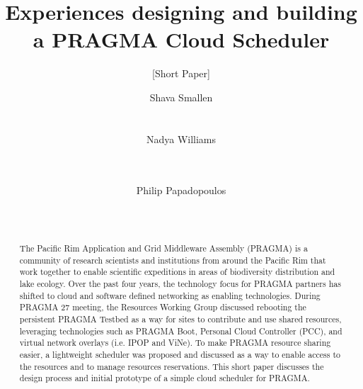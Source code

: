 \documentclass{acm_proc_article-sp}
\begin{document}
\title{Experiences designing and building a PRAGMA Cloud Scheduler}
\subtitle{[Short Paper]}


\author{
\alignauthor
Shava Smallen\\
      \\
      \\
\alignauthor
Nadya Williams\\
      \\
      \\
\and %
\alignauthor Philip Papadopoulos \\
      \\
      \\
}

\maketitle
\begin{abstract}
The Pacific Rim Application and Grid Middleware Assembly (PRAGMA) is a community of research scientists and institutions from around the Pacific Rim that work together to enable scientific expeditions in areas of biodiversity distribution and lake ecology.  Over the past four years, the technology focus for PRAGMA partners has shifted to cloud and software defined networking as enabling technologies.  During PRAGMA 27 meeting, the Resources Working Group discussed rebooting the persistent PRAGMA Testbed as a way for sites to contribute and use shared resources, leveraging technologies such as PRAGMA Boot, Personal Cloud Controller (PCC), and virtual network overlays (i.e. IPOP and ViNe).  To make PRAGMA resource sharing easier, a lightweight scheduler was proposed and discussed as a way to enable access to the resources and to manage resources reservations.  This short paper discusses the design process and initial prototype of a simple cloud scheduler for PRAGMA.  

\end{abstract}
\end{document}
